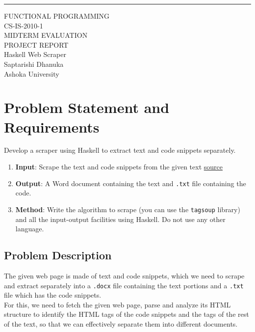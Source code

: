 \documentclass{scrreprt}
\date{}
\begin{document}
\begin{flushright}
    \rule{16cm}{5pt}\vskip1cm
    \begin{bfseries}
        \Huge{FUNCTIONAL PROGRAMMING \\ CS-IS-2010-1 \\ MIDTERM EVALUATION \\ PROJECT REPORT}\\
        \vspace{1.9cm}
        Haskell Web Scraper\\
        \vspace{1.9cm}
        Saptarishi Dhanuka\\
        \vspace{1.9cm}
        Ashoka University\\
    \end{bfseries}
\end{flushright}

\tableofcontents



\chapter{Problem Statement and Requirements}
\begin{tcolorbox}[colback=white,colframe=gray,title={Assigned Project Statement}]
    Develop a scraper using Haskell to extract text and code snippets separately.
    \begin{enumerate}
        \item \textbf{Input}: Scrape the text and code snippets from the given text \href{https://eli.thegreenplace.net/2018/type-erasure-and-reification/}{source}
        \item \textbf{Output}: A Word document containing the text and \texttt{.txt} file containing the code.
        \item \textbf{Method}: Write the algorithm to scrape (you can use the \texttt{tagsoup} library) and all the input-output facilities using Haskell. Do not use any other language.
    \end{enumerate}
\end{tcolorbox}


\section{Problem Description}
The given web page is made of text and code snippets, which we need to scrape and extract separately into a \texttt{.docx} file containing the text portions and a \texttt{.txt} file which has the code snippets. \\ For this, we need to fetch the given web page, parse and analyze its HTML structure to identify the HTML tags of the code snippets and the tags of the rest of the text, so that we can effectively separate them into different documents.
\end{document}
